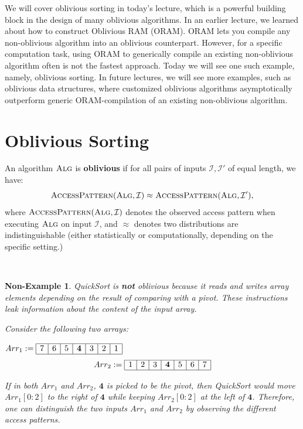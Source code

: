 \newcommand{\rsmpl}{\xleftarrow{\$}}

\newcommand{\alg}{\textsc{Alg}}

\newcommand{\ap}{\textsc{AccessPattern}}
\newtheorem{nonexample}[theorem]{Non-Example}


We will cover oblivious sorting in today's lecture, which is
a powerful building
block in the design of many oblivious algorithms. 
In an earlier lecture, we learned about how to construct Oblivious RAM (ORAM).
ORAM lets you compile any 
non-oblivious algorithm into an oblivious counterpart.
However, for a specific computation task,
using ORAM to generically compile an existing non-oblivious algorithm
often is not the fastest approach. 
Today we will see one such example, namely, oblivious sorting.
In future lectures, we will see more examples, 
such as oblivious data structures, where customized oblivious algorithms
asymptotically outperform generic ORAM-compilation 
of an existing non-oblivious algorithm.  

\section{Oblivious Sorting}

\begin{definition}
    An algorithm $\alg$ is \textbf{oblivious} if for all pairs of inputs $\mathcal{I}, \mathcal{I}'$ of equal length, we have:
    \[\ap(\alg, \mathcal{I}) \approx \ap(\alg, \mathcal{I}'), \]
where $\ap(\alg, \mathcal{I})$ denotes the observed access pattern when executing $\alg$ on input $\mathcal{I}$, and $\approx$ denotes two distributions are indistinguishable (either statistically or computationally, depending on the specific setting.)
\end{definition}

$ $

\begin{nonexample}
    QuickSort is \textbf{not} oblivious because it reads and writes array elements depending on the result of comparing with a pivot. These instructions leak information about the content of the input array.

    Consider the following two arrays: 
    \begin{center} 
 $Arr_1 := \begin{array}{|c|c|c|c|c|c|c|} \hline 
 7 & 6 & 5 & \textbf{4} & 3 & 2 & 1
 \\ 
\hline
\end{array}
$
 \[ Arr_2 := \begin{array}{|c|c|c|c|c|c|c|} \hline 
1 & 2 & 3 & \textbf{4} & 5 & 6 & 7
\\ 
\hline
\end{array}
\]

\end{center}

If in both $Arr_1$ and $Arr_2$, $\textbf{4}$ is picked to be the pivot, then QuickSort would move $Arr_1[0:2]$ to the right of $\textbf{4}$ while keeping $Arr_2[0:2]$ at the left of $\textbf{4}$. Therefore, one can distinguish the two inputs $Arr_1$ and $Arr_2$ by observing the different access patterns. 

\end{nonexample}

